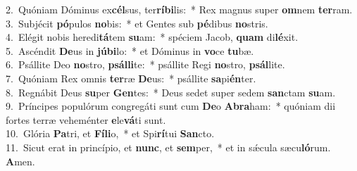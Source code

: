 {2.~}Quóniam Dóminus ex\textbf{cél}sus, ter\textbf{rí}\textbf{bi}lis:~* Rex magnus super \textbf{om}nem \textbf{ter}ram.\\
{3.~}Subjécit \textbf{pó}pulos \textbf{no}bis:~* et Gentes sub \textbf{pé}dibus \textbf{no}stris.\\
{4.~}Elégit nobis heredi\textbf{tá}tem \textbf{su}am:~* spéciem Jacob, \textbf{quam} di\textbf{lé}xit.\\
{5.~}Ascéndit \textbf{De}us in \textbf{jú}\textbf{bi}lo:~* et Dóminus in \textbf{vo}ce \textbf{tu}bæ.\\
{6.~}Psállite Deo \textbf{no}stro, \textbf{psál}\textbf{li}te:~* psállite Regi \textbf{no}stro, \textbf{psál}lite.\\
{7.~}Quóniam Rex omnis \textbf{ter}ræ \textbf{De}us:~* psállite \textbf{sa}pi\textbf{én}ter.\\
{8.~}Regnábit Deus \textbf{su}per \textbf{Gen}tes:~* Deus sedet super sedem \textbf{san}ctam \textbf{su}am.\\
{9.~}Príncipes populórum congregáti sunt cum \textbf{De}o \textbf{A}\textbf{bra}ham:~* quóniam dii fortes terræ veheménter \textbf{e}le\textbf{vá}ti sunt.\\
{10.~}Glória \textbf{Pa}tri, et \textbf{Fí}\textbf{li}o,~* et Spi\textbf{rí}tui \textbf{San}cto.\\
{11.~}Sicut erat in princípio, et \textbf{nunc}, et \textbf{sem}per,~* et in sǽcula sæcu\textbf{ló}rum. \textbf{A}men.\\
